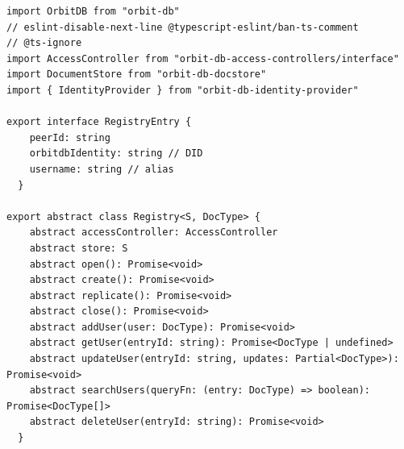 \begin{verbatim}
import OrbitDB from "orbit-db"
// eslint-disable-next-line @typescript-eslint/ban-ts-comment
// @ts-ignore
import AccessController from "orbit-db-access-controllers/interface"
import DocumentStore from "orbit-db-docstore"
import { IdentityProvider } from "orbit-db-identity-provider"

export interface RegistryEntry {
    peerId: string
    orbitdbIdentity: string // DID
    username: string // alias
  }

export abstract class Registry<S, DocType> {
    abstract accessController: AccessController
    abstract store: S
    abstract open(): Promise<void>
    abstract create(): Promise<void>
    abstract replicate(): Promise<void>
    abstract close(): Promise<void>
    abstract addUser(user: DocType): Promise<void>
    abstract getUser(entryId: string): Promise<DocType | undefined>
    abstract updateUser(entryId: string, updates: Partial<DocType>): Promise<void>
    abstract searchUsers(queryFn: (entry: DocType) => boolean): Promise<DocType[]>
    abstract deleteUser(entryId: string): Promise<void>
  }
\end{verbatim}
